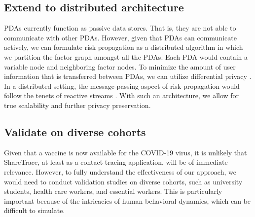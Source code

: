 \subsection{Extend to distributed architecture}
\par PDAs currently function as passive data stores. That is, they are not able to communicate with other PDAs. However, given that PDAs can communicate actively, we can formulate risk propagation as a distributed algorithm in which we partition the factor graph amongst all the PDAs. Each PDA would contain a variable node and neighboring factor nodes. To minimize the amount of user information that is transferred between PDAs, we can utilize differential privacy \cite{Cynthia2008}. In a distributed setting, the message-passing aspect of risk propagation would follow the tenets of reactive streams \cite{manifesto214, streams2021}. With such an architecture, we allow for true scalability and further privacy preservation.

\subsection{Validate on diverse cohorts}
\par Given that a vaccine is now available for the COVID-19 virus, it is unlikely that ShareTrace, at least as a contact tracing application, will be of immediate relevance. However, to fully understand the effectiveness of our approach, we would need to conduct validation studies on diverse cohorts, such as university students, health care workers, and essential workers. This is particularly important because of the intricacies of human behavioral dynamics, which can be difficult to simulate.